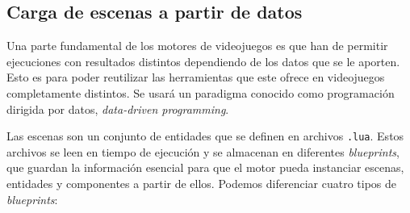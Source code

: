 \subsection{Carga de escenas a partir de datos}
Una parte fundamental de los motores de videojuegos es que han de permitir ejecuciones con resultados distintos dependiendo de los datos que se le aporten. Esto es para poder reutilizar las herramientas que este ofrece en videojuegos completamente distintos. Se usará un paradigma conocido como programación dirigida por datos, \textit{data-driven programming}. 

\medskip

Las escenas son un conjunto de entidades que se definen en archivos \texttt{.lua}. Estos archivos se leen en tiempo de ejecución y se almacenan en diferentes \textit{blueprints}, que guardan la información esencial para que el motor pueda instanciar escenas, entidades y componentes a partir de ellos. Podemos diferenciar cuatro tipos de \textit{blueprints}: 

